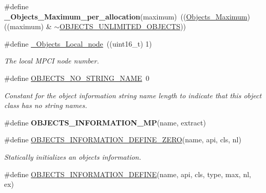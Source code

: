 \begin{DoxyCompactItemize}
\#define {\bfseries \+\_\+\+Objects\+\_\+\+Maximum\+\_\+per\+\_\+allocation}(maximum)~((\mbox{\hyperlink{group__RTEMSScoreObject_gaa2735357885ec7d7157c32f3f835f9ae}{Objects\+\_\+\+Maximum}}) ((maximum) \& $\sim$\mbox{\hyperlink{group__RTEMSScoreObject_ga2e39d2184f4f29e069ff679d9be47040}{O\+B\+J\+E\+C\+T\+S\+\_\+\+U\+N\+L\+I\+M\+I\+T\+E\+D\+\_\+\+O\+B\+J\+E\+C\+TS}}))
\item 
\mbox{\label{group__RTEMSScoreObject_gafce603d3ba30b449a14f810d60f6f18e}} 
\#define \mbox{\hyperlink{group__RTEMSScoreObject_gafce603d3ba30b449a14f810d60f6f18e}{\+\_\+\+Objects\+\_\+\+Local\+\_\+node}}~((uint16\+\_\+t) 1)
\begin{DoxyCompactList}\small\item\em The local M\+P\+CI node number. \end{DoxyCompactList}\item 
\mbox{\label{group__RTEMSScoreObject_gab28c254ca8b651021dff18d181e053f2}} 
\#define \mbox{\hyperlink{group__RTEMSScoreObject_gab28c254ca8b651021dff18d181e053f2}{O\+B\+J\+E\+C\+T\+S\+\_\+\+N\+O\+\_\+\+S\+T\+R\+I\+N\+G\+\_\+\+N\+A\+ME}}~0
\begin{DoxyCompactList}\small\item\em Constant for the object information string name length to indicate that this object class has no string names. \end{DoxyCompactList}\item 
\mbox{\label{group__RTEMSScoreObject_ga44772d36c19992a2afe455c26a4ef8a0}} 
\#define {\bfseries O\+B\+J\+E\+C\+T\+S\+\_\+\+I\+N\+F\+O\+R\+M\+A\+T\+I\+O\+N\+\_\+\+MP}(name,  extract)
\item 
\#define \mbox{\hyperlink{group__RTEMSScoreObject_ga95e30a95356d2254e6b8839e654cccfc}{O\+B\+J\+E\+C\+T\+S\+\_\+\+I\+N\+F\+O\+R\+M\+A\+T\+I\+O\+N\+\_\+\+D\+E\+F\+I\+N\+E\+\_\+\+Z\+E\+RO}}(name,  api,  cls,  nl)
\begin{DoxyCompactList}\small\item\em Statically initializes an objects information. \end{DoxyCompactList}\item 
\#define \mbox{\hyperlink{group__RTEMSScoreObject_gac485289406e4297a576a74f72a28f608}{O\+B\+J\+E\+C\+T\+S\+\_\+\+I\+N\+F\+O\+R\+M\+A\+T\+I\+O\+N\+\_\+\+D\+E\+F\+I\+NE}}(name,  api,  cls,  type,  max,  nl,  ex)

\end{DoxyCompactItemize}
